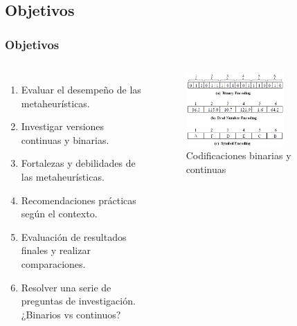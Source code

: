 \note{

}

\subsection{Objetivos}
\begin{frame}
  \frametitle{Objetivos}
  \begin{columns}
    \begin{enumerate}
      \item Evaluar el desempeño de las metaheurísticas.
      \item Investigar versiones continuas y binarias.
      \item Fortalezas y debilidades de las metaheurísticas.
      \item Recomendaciones prácticas según el contexto.
      \item Evaluación de resultados finales y realizar comparaciones.
      \item Resolver una serie de preguntas de investigación. ¿Binarios vs continuos?
    \end{enumerate}
    \begin{figure}
      \begin{center}
        \includegraphics[width=0.7\textwidth]{imagenes/chapter1/real_vs_bin.png}
      \end{center}
      \caption{Codificaciones binarias y continuas\footnotemark[1]}
    \end{figure}
  \end{columns}
\end{frame}

\note{

}

